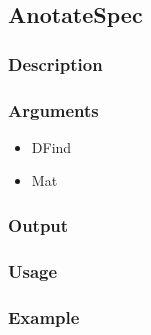 \subsection{AnotateSpec}
\subsubsection{Description}
\subsubsection{Arguments}

\begin{itemize}
\item DFind
\item Mat
\end{itemize}


\subsubsection{Output}
\subsubsection{Usage}
\subsubsection{Example}



